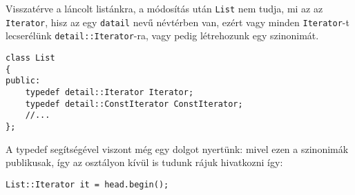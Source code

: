 \documentclass[a4paper,11.5pt,table]{article}
\begin{document}
	Visszatérve a láncolt listánkra, a módosítás után \texttt{List} nem tudja, mi az az \texttt{Iterator}, hisz az egy \texttt{datail} nevű névtérben van, ezért vagy minden \texttt{Iterator}-t lecserélünk \texttt{detail::Iterator}-ra, vagy pedig létrehozunk egy szinonimát.
	\begin{lstlisting}
class List
{
public:
	typedef detail::Iterator Iterator;
	typedef detail::ConstIterator ConstIterator;
	//...
};
	\end{lstlisting}
	A typedef segítségével viszont még egy dolgot nyertünk: mivel ezen a szinonimák publikusak, így az osztályon kívül is tudunk rájuk hivatkozni így:
	\begin{lstlisting}
List::Iterator it = head.begin();
	\end{lstlisting}
	
	
\end{document}
